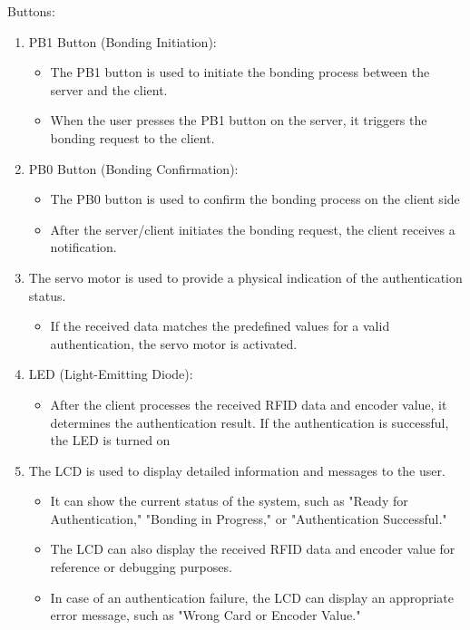 \documentclass[a4paper,11pt]{article}%
\begin{document}
Buttons:
\begin{enumerate}
    \item PB1 Button (Bonding Initiation):
          \begin{itemize}
              \item The PB1 button is used to initiate the bonding process between the server and the client.
              \item When the user presses the PB1 button on the server, it triggers the bonding request to the client.
          \end{itemize}
    \item PB0 Button (Bonding Confirmation):
          \begin{itemize}
              \item The PB0 button is used to confirm the bonding process on the client side
              \item After the server/client initiates the bonding request, the client receives a notification.
          \end{itemize}
    \item The servo motor is used to provide a physical indication of the authentication status.
          \begin{itemize}
              \item If the received data matches the predefined values for a valid authentication, the servo motor is activated.
          \end{itemize}
    \item LED (Light-Emitting Diode):
          \begin{itemize}
              \item After the client processes the received RFID data and encoder value, it determines the authentication result.
                    If the authentication is successful, the LED is turned on
          \end{itemize}
    \item The LCD is used to display detailed information and messages to the user.
          \begin{itemize}
              \item It can show the current status of the system, such as "Ready for Authentication," "Bonding in Progress," or "Authentication Successful."
              \item The LCD can also display the received RFID data and encoder value for reference or debugging purposes.
              \item In case of an authentication failure, the LCD can display an appropriate error message, such as "Wrong Card or Encoder Value."
          \end{itemize}
\end{enumerate}
\end{document}
